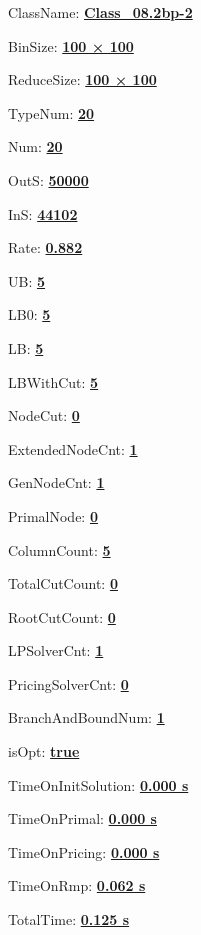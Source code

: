 \documentclass[11pt]{article}
\begin{document}
\pagestyle{empty}


ClassName: \underline{\textbf{Class_08.2bp-2}}
\par
BinSize: \underline{\textbf{100 × 100}}
\par
ReduceSize: \underline{\textbf{100 × 100}}
\par
TypeNum: \underline{\textbf{20}}
\par
Num: \underline{\textbf{20}}
\par
OutS: \underline{\textbf{50000}}
\par
InS: \underline{\textbf{44102}}
\par
Rate: \underline{\textbf{0.882}}
\par
UB: \underline{\textbf{5}}
\par
LB0: \underline{\textbf{5}}
\par
LB: \underline{\textbf{5}}
\par
LBWithCut: \underline{\textbf{5}}
\par
NodeCut: \underline{\textbf{0}}
\par
ExtendedNodeCnt: \underline{\textbf{1}}
\par
GenNodeCnt: \underline{\textbf{1}}
\par
PrimalNode: \underline{\textbf{0}}
\par
ColumnCount: \underline{\textbf{5}}
\par
TotalCutCount: \underline{\textbf{0}}
\par
RootCutCount: \underline{\textbf{0}}
\par
LPSolverCnt: \underline{\textbf{1}}
\par
PricingSolverCnt: \underline{\textbf{0}}
\par
BranchAndBoundNum: \underline{\textbf{1}}
\par
isOpt: \underline{\textbf{true}}
\par
TimeOnInitSolution: \underline{\textbf{0.000 s}}
\par
TimeOnPrimal: \underline{\textbf{0.000 s}}
\par
TimeOnPricing: \underline{\textbf{0.000 s}}
\par
TimeOnRmp: \underline{\textbf{0.062 s}}
\par
TotalTime: \underline{\textbf{0.125 s}}
\par
\newpage


\end{document}
